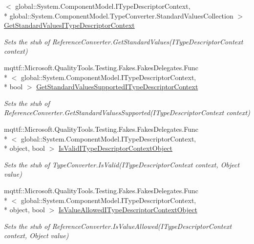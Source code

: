 \begin{DoxyCompactItemize}
$<$ global\-::\-System.\-Component\-Model.\-I\-Type\-Descriptor\-Context, \\*
global\-::\-System.\-Component\-Model.\-Type\-Converter.\-Standard\-Values\-Collection $>$ \hyperlink{class_system_1_1_component_model_1_1_fakes_1_1_stub_component_converter_a8b064dc91f62321b839fe3500ce7318c}{Get\-Standard\-Values\-I\-Type\-Descriptor\-Context}
\begin{DoxyCompactList}\small\item\em Sets the stub of Reference\-Converter.\-Get\-Standard\-Values(\-I\-Type\-Descriptor\-Context context)\end{DoxyCompactList}\item 
mqttf\-::\-Microsoft.\-Quality\-Tools.\-Testing.\-Fakes.\-Fakes\-Delegates.\-Func\\*
$<$ global\-::\-System.\-Component\-Model.\-I\-Type\-Descriptor\-Context, \\*
bool $>$ \hyperlink{class_system_1_1_component_model_1_1_fakes_1_1_stub_component_converter_a2a8aef88755ab5b501294f744f1a92e3}{Get\-Standard\-Values\-Supported\-I\-Type\-Descriptor\-Context}
\begin{DoxyCompactList}\small\item\em Sets the stub of Reference\-Converter.\-Get\-Standard\-Values\-Supported(\-I\-Type\-Descriptor\-Context context)\end{DoxyCompactList}\item 
mqttf\-::\-Microsoft.\-Quality\-Tools.\-Testing.\-Fakes.\-Fakes\-Delegates.\-Func\\*
$<$ global\-::\-System.\-Component\-Model.\-I\-Type\-Descriptor\-Context, \\*
object, bool $>$ \hyperlink{class_system_1_1_component_model_1_1_fakes_1_1_stub_component_converter_a71d6d437e3e509526074a04d9a957dbc}{Is\-Valid\-I\-Type\-Descriptor\-Context\-Object}
\begin{DoxyCompactList}\small\item\em Sets the stub of Type\-Converter.\-Is\-Valid(\-I\-Type\-Descriptor\-Context context, Object value)\end{DoxyCompactList}\item 
mqttf\-::\-Microsoft.\-Quality\-Tools.\-Testing.\-Fakes.\-Fakes\-Delegates.\-Func\\*
$<$ global\-::\-System.\-Component\-Model.\-I\-Type\-Descriptor\-Context, \\*
object, bool $>$ \hyperlink{class_system_1_1_component_model_1_1_fakes_1_1_stub_component_converter_aef3dd62fe1c9bdecc6384553f8afb995}{Is\-Value\-Allowed\-I\-Type\-Descriptor\-Context\-Object}
\begin{DoxyCompactList}\small\item\em Sets the stub of Reference\-Converter.\-Is\-Value\-Allowed(\-I\-Type\-Descriptor\-Context context, Object value)\end{DoxyCompactList}\end{DoxyCompactItemize}
